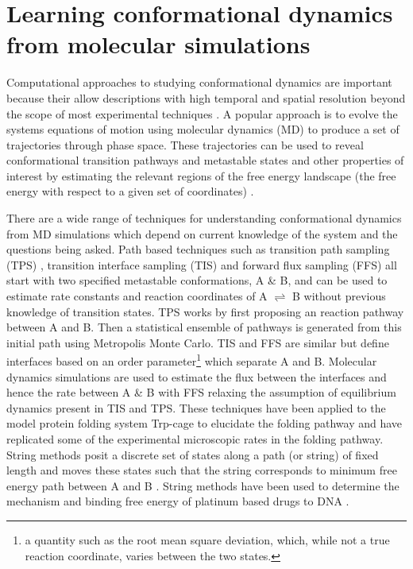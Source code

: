 \section{Learning conformational dynamics from molecular simulations}

Computational approaches to studying conformational dynamics are important because their allow descriptions with high temporal and spatial resolution beyond the scope of most experimental techniques \cite{hugginsBiomolecularSimulationsDynamics2019}. A popular approach is to evolve the systems equations of motion using molecular dynamics (MD) to produce a set of trajectories through phase space. These trajectories can be used to reveal conformational transition pathways and metastable states and other properties of interest by estimating the relevant regions of the free energy landscape (the free energy with respect to a given set of coordinates)  \cite{rohrdanzDiscoveringMountainPasses2013a}.  

There are a wide range of techniques for understanding conformational dynamics from MD simulations which depend on current knowledge of the system and the questions being asked. Path based techniques such as transition path sampling (TPS) \cite{bolhuisTRANSITIONPATHSAMPLING2002, dellagoTransitionPathSampling1998, dellagoTransitionPathSampling2002a}, transition interface sampling (TIS) \cite{vanerpNovelPathSampling2003} and forward flux sampling (FFS) 
\cite{allenSamplingRareSwitching2005} all start with two specified metastable conformations, A \& B, and can be used to estimate rate constants and reaction coordinates of A $\rightleftharpoons$ B without previous knowledge of transition states. TPS works by first proposing an reaction pathway between A and B. Then a statistical ensemble of pathways is generated from this initial path using Metropolis Monte Carlo. TIS and FFS are similar but define interfaces based on an order parameter\footnote{a quantity such as the root mean square deviation, which, while not a true reaction coordinate, varies between the two states.} which separate A and B. Molecular dynamics simulations are used to estimate the flux between the interfaces and hence the rate between A \& B with FFS relaxing the assumption of equilibrium dynamics present in TIS and TPS. These techniques have been applied \cite{juraszekSamplingMultipleFolding2006, juraszekRateConstantReaction2008,velez-vegaKineticsMechanismUnfolding2010} to the model protein folding system Trp-cage \cite{neidighDesigning20residueProtein2002} to elucidate the folding pathway and have replicated some of the experimental microscopic rates in the folding pathway. String methods posit a discrete set of states along a path (or string) of fixed length and moves these states such that the string corresponds to minimum free energy path between A and B \cite{weinane.TransitionPathTheoryPathFinding2010, jnssonNudgedElasticBand1998}. String methods have been used to determine the mechanism and binding free energy of platinum based drugs to DNA \cite{elderSequenceSpecificRecognitionCancer2012}. 

